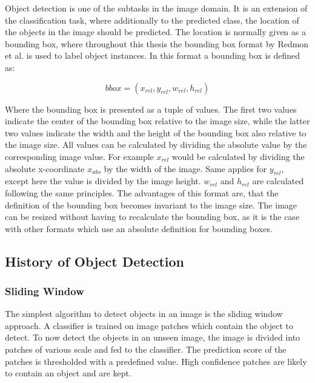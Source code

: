 \label{sec:object_detection}

Object detection is one of the subtasks in the image domain.
It is an extension of the classification task, where additionally to the predicted class, the location of the objects in the image should be predicted.
The location is normally given as a bounding box, where throughout this thesis the bounding box format by Redmon et al. \cite{yolov1} is used to label object instances.
In this format a bounding box is defined as:

\begin{equation}
    bbox = (x_{rel}, y_{rel}, w_{rel}, h_{rel})
\end{equation}

Where the bounding box is presented as a tuple of values.
The first two values indicate the center of the bounding box relative to the image size, while the latter two values indicate the width and the height of the bounding box also relative to the image size.
All values can be calculated by dividing the absolute value by the corresponding image value.
For example $x_{rel}$ would be calculated by dividing the absolute x-coordinate $x_{abs}$ by the width of the image.
Same applies for $y_{rel}$, except here the value is divided by the image height.
$w_{rel}$ and $h_{rel}$ are calculated following the same principles.
The advantages of this format are, that the definition of the bounding box becomes invariant to the image size.
The image can be resized without having to recalculate the bounding box, as it is the case with other formats which use an absolute definition for bounding boxes.

\subsection{History of Object Detection}
\label{sec:hostory_obj_detection}

\subsubsection{Sliding Window}
The simplest algorithm to detect objects in an image is the sliding window approach.
A classifier is trained on image patches which contain the object to detect.
To now detect the objects in an unseen image, the image is divided into patches of various scale and fed to the classifier.
The prediction score of the patches is thresholded with a predefined value.
High confidence patches are likely to contain an object and are kept. \cite{sliding_window_satelite}

